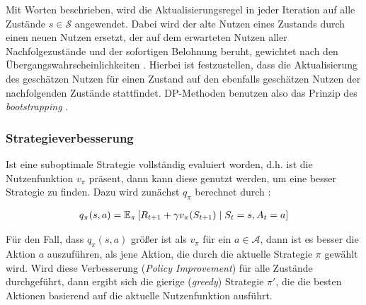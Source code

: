 Mit Worten beschrieben, wird die Aktualisierungsregel in jeder Iteration auf alle Zustände $s \in \mathcal{S}$ angewendet. Dabei wird der alte Nutzen eines Zustands durch einen neuen Nutzen ersetzt, der auf dem erwarteten Nutzen aller Nachfolgezustände und der sofortigen Belohnung beruht, gewichtet nach den Übergangswahrscheinlichkeiten \cite[S.~20]{Wiering}. Hierbei ist festzustellen, dass die  Aktualisierung des geschätzen Nutzen für einen Zustand auf den ebenfalls geschätzen Nutzen der nachfolgenden Zustände stattfindet. DP-Methoden benutzen also das Prinzip des \textit{bootstrapping} \cite[S.~89]{Sutton1998}.

\subsubsection{Strategieverbesserung}
Ist eine suboptimale Strategie vollständig evaluiert worden, d.h. ist die Nutzenfunktion $v_\pi$ präsent, dann kann diese genutzt werden, um eine besser Strategie zu finden. Dazu wird zunächst $q_\pi$ berechnet durch \cite[S.~21]{Wiering}:

\begin{equation}\label{eq:qBerechnung}
    \begin{aligned}
        q_\pi(s,a) = \operatorname{\mathbb{E}}_\pi\left[ R_{t+1} + \gamma v_\pi(S_{t+1}) \mid S_t = s, A_t=a\right]
    \end{aligned}
\end{equation}

Für den Fall, dass $q_\pi(s,a)$ größer ist als $v_\pi$ für ein $a \in \mathcal{A}$, dann ist es besser die Aktion $a$ auszuführen, als jene Aktion, die durch die aktuelle Strategie $\pi$ gewählt wird. Wird diese Verbesserung (\textit{Policy Improvement}) für alle Zustände durchgeführt, dann ergibt sich die gierige (\textit{greedy}) Strategie $\pi'$, die die besten Aktionen basierend auf die aktuelle Nutzenfunktion ausführt.

